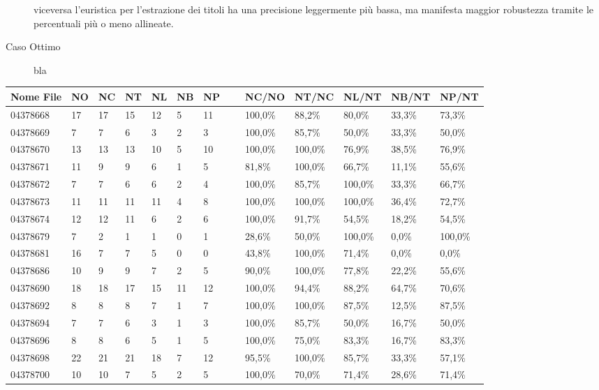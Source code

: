 \begin{description}
viceversa l'euristica per l'estrazione dei titoli ha una precisione leggermente più bassa, ma manifesta maggior robustezza tramite le percentuali più o meno allineate.
	\item[Caso Ottimo] bla
\end{description}


	\begin{table}\label{tab:icdar}
	\begin{center}
	\begin{tabular}{|l|l|l|l|l|l|l|l|l|l|l|l|l|} \hline
Nome File & NO & NC & NT & NL & NB & NP & ~ & NC/NO & NT/NC & NL/NT & NB/NT & NP/NT \\ \hline
04378668 & 17 & 17 & 15 & 12 & 5 & 11 & ~ & 100,0\% & 88,2\% & 80,0\% & 33,3\% & 73,3\% \\
04378669 & 7 & 7 & 6 & 3 & 2 & 3 & ~ & 100,0\% & 85,7\% & 50,0\% & 33,3\% & 50,0\%\\
04378670 & 13 & 13 & 13 & 10 & 5 & 10 & ~ & 100,0\% & 100,0\% & 76,9\% & 38,5\% & 76,9\%\\
04378671 & 11 & 9 & 9 & 6 & 1 & 5 & ~ & 81,8\% & 100,0\% & 66,7\% & 11,1\% & 55,6\%\\
04378672 & 7 & 7 & 6 & 6 & 2 & 4 & ~ & 100,0\% & 85,7\% & 100,0\% & 33,3\% & 66,7\%\\
04378673 & 11 & 11 & 11 & 11 & 4 & 8 & ~ & 100,0\% & 100,0\% & 100,0\% & 36,4\% & 72,7\%\\
04378674 & 12 & 12 & 11 & 6 & 2 & 6 & ~ & 100,0\% & 91,7\% & 54,5\% & 18,2\% & 54,5\%\\
04378679 & 7 & 2 & 1 & 1 & 0 & 1 & ~ & 28,6\% & 50,0\% & 100,0\% & 0,0\% & 100,0\%\\
04378681 & 16 & 7 & 7 & 5 & 0 & 0 & ~ & 43,8\% & 100,0\% & 71,4\% & 0,0\% & 0,0\%\\
04378686 & 10 & 9 & 9 & 7 & 2 & 5 & ~ & 90,0\% & 100,0\% & 77,8\% & 22,2\% & 55,6\%\\
04378690 & 18 & 18 & 17 & 15 & 11 & 12 & ~ & 100,0\% & 94,4\% & 88,2\% & 64,7\% & 70,6\%\\
04378692 & 8 & 8 & 8 & 7 & 1 & 7 & ~ & 100,0\% & 100,0\% & 87,5\% & 12,5\% & 87,5\%\\
04378694 & 7 & 7 & 6 & 3 & 1 & 3 & ~ & 100,0\% & 85,7\% & 50,0\% & 16,7\% & 50,0\%\\
04378696 & 8 & 8 & 6 & 5 & 1 & 5 & ~ & 100,0\% & 75,0\% & 83,3\% & 16,7\% & 83,3\%\\
04378698 & 22 & 21 & 21 & 18 & 7 & 12 & ~ & 95,5\% & 100,0\% & 85,7\% & 33,3\% & 57,1\%\\
04378700 & 10 & 10 & 7 & 5 & 2 & 5 & ~ & 100,0\% & 70,0\% & 71,4\% & 28,6\% & 71,4\%\\

\end{tabular}
\end{center}
\end{table}
